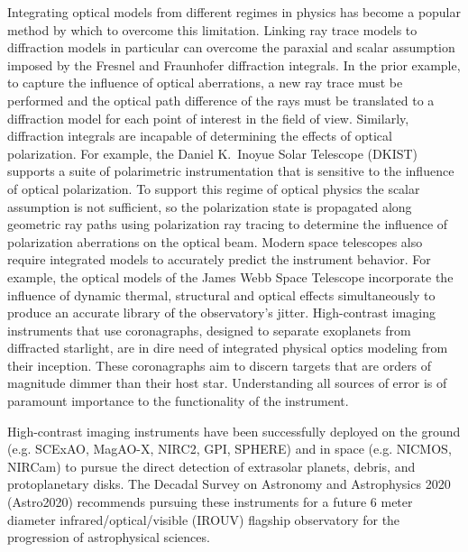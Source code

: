 Integrating optical models from different regimes in physics has become a popular method by which to overcome this limitation. Linking ray trace models to diffraction models in particular can overcome the paraxial and scalar assumption imposed by the Fresnel and Fraunhofer diffraction integrals. In the prior example, to capture the influence of optical aberrations, a new ray trace must be performed and the optical path difference of the rays must be translated to a diffraction model for each point of interest in the field of view. Similarly, diffraction integrals are incapable of determining the effects of optical polarization. For example, the Daniel K.~Inoyue Solar Telescope (DKIST) supports a suite of polarimetric instrumentation that is sensitive to the influence of optical polarization. To support this regime of optical physics the scalar assumption is not sufficient, so the polarization state is propagated along geometric ray paths using polarization ray tracing\cite{Chippman15,anche_inprep} to determine the influence of polarization aberrations on the optical beam\cite{Harrington2017}. Modern space telescopes also require integrated models to accurately predict the instrument behavior. For example, the optical models of the James Webb Space Telescope incorporate the influence of dynamic thermal, structural and optical effects simultaneously to produce an accurate library of the observatory's jitter\cite{Mather2004}. High-contrast imaging instruments that use coronagraphs, designed to separate exoplanets from diffracted starlight, are in dire need of integrated physical optics modeling from their inception. These coronagraphs aim to discern targets that are orders of magnitude dimmer than their host star\cite{Guyon_2006,2015ApJStark,2018Pueyo}. Understanding all sources of error is of paramount importance to the functionality of the instrument.

High-contrast imaging instruments have been successfully deployed on the ground (e.g. SCExAO\cite{Lozi18}, MagAO-X\cite{Males18}, NIRC2\cite{Femenia16}, GPI\cite{Macintosh14}, SPHERE\cite{refId0}) and in space (e.g. NICMOS\cite{thompson_near_1994}, NIRCam\cite{horner_near-infrared_2004,Nircam_exoplanet}) to pursue the direct detection of extrasolar planets, debris, and protoplanetary disks. 
The Decadal Survey on Astronomy and Astrophysics 2020 (Astro2020) recommends pursuing these instruments for a future 6 meter diameter infrared/optical/visible (IROUV) flagship observatory for the progression of astrophysical sciences\cite{decadal_survey_on_astronomy_and_astrophysics_2020_astro2020_pathways_2021}. 

